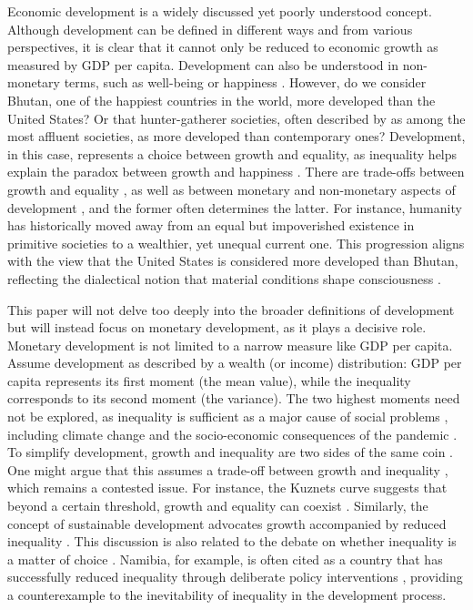\documentclass[12pt]{article}
\begin{document}
Economic development is a widely discussed yet poorly understood concept. Although development can be defined in different ways and from various perspectives, it is clear that it cannot only be reduced to economic growth as measured by GDP per capita. Development can also be understood in non-monetary terms, such as well-being or happiness \parencite{agrawal2024economic}. However, do we consider Bhutan, one of the happiest countries in the world, more developed than the United States? Or that hunter-gatherer societies, often described by \textcite{sahlins2013original} as among the most affluent societies, as more developed than contemporary ones? Development, in this case, represents a choice between growth and equality, as inequality helps explain the paradox between growth and happiness \parencite{oishi2015income}. There are trade-offs between growth and equality \parencite{okun2010equality}, as well as between monetary and non-monetary aspects of development \parencite{kahneman2010high}, and the former often determines the latter. For instance, humanity has historically moved away from an equal but impoverished existence in primitive societies to a wealthier, yet unequal current one. This progression aligns with the view that the United States is considered more developed than Bhutan, reflecting the dialectical notion that material conditions shape consciousness \parencite{lefebvre2009dialectical}. 

This paper will not delve too deeply into the broader definitions of development but will instead focus on monetary development, as it plays a decisive role. Monetary development is not limited to a narrow measure like GDP per capita. Assume development as described by a wealth (or income) distribution: GDP per capita represents its first moment (the mean value), while the inequality corresponds to its second moment (the variance). The two highest moments need not be explored, as inequality is sufficient as a major cause of social problems \parencite{neckerman2007inequality}, including climate change \parencite{duong2023does} and the socio-economic consequences of the pandemic \parencite{stantcheva2022inequalities}. To simplify development, growth and inequality are two sides of the same coin \parencite{berg2017inequality}. One might argue that this assumes a trade-off between growth and inequality \parencite{okun2010equality}, which remains a contested issue. For instance, the Kuznets curve suggests that beyond a certain threshold, growth and equality can coexist \parencite{nielsen1997kuznets}. Similarly, the concept of sustainable development advocates growth accompanied by reduced inequality \parencite{freistein2016potential}. This discussion is also related to the debate on whether inequality is a matter of choice \parencite{stiglitz2013inequality}. Namibia, for example, is often cited as a country that has successfully reduced inequality through deliberate policy interventions \parencite{lawson2017inequality}, providing a counterexample to the inevitability of inequality in the development process.
\end{document}
